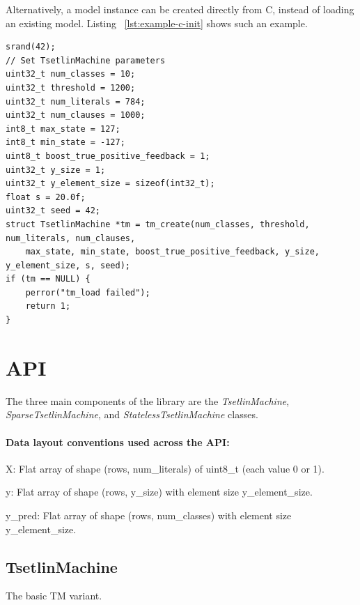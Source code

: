 Alternatively, a model instance can be created directly from C, instead of loading an existing model. Listing ~\ref{lst:example-c-init} shows such an example.

\begin{listing}[!htbp]
    \caption{Example C model initialization\label{lst:example-c-init}}
    \begin{verbatim}
srand(42);
// Set TsetlinMachine parameters
uint32_t num_classes = 10;
uint32_t threshold = 1200;
uint32_t num_literals = 784;
uint32_t num_clauses = 1000;
int8_t max_state = 127;
int8_t min_state = -127;
uint8_t boost_true_positive_feedback = 1;
uint32_t y_size = 1;
uint32_t y_element_size = sizeof(int32_t);
float s = 20.0f;
uint32_t seed = 42;
struct TsetlinMachine *tm = tm_create(num_classes, threshold, num_literals, num_clauses,
    max_state, min_state, boost_true_positive_feedback, y_size, y_element_size, s, seed);
if (tm == NULL) {
    perror("tm_load failed");
    return 1;
}
    \end{verbatim}
\end{listing}
\FloatBarrier

\section{API}
The three main components of the \LibraryName library are the \emph{TsetlinMachine}, \emph{SparseTsetlinMachine}, and \emph{StatelessTsetlinMachine} classes.

\paragraph{Data layout conventions used across the API:}
\begin{compactitem}
    \item X: Flat array of shape (rows, num\_literals) of uint8\_t (each value 0 or 1).
    \item y: Flat array of shape (rows, y\_size) with element size y\_element\_size.
    \item y\_pred: Flat array of shape (rows, num\_classes) with element size y\_element\_size.
\end{compactitem}

\subsection{TsetlinMachine}
The basic TM variant.


